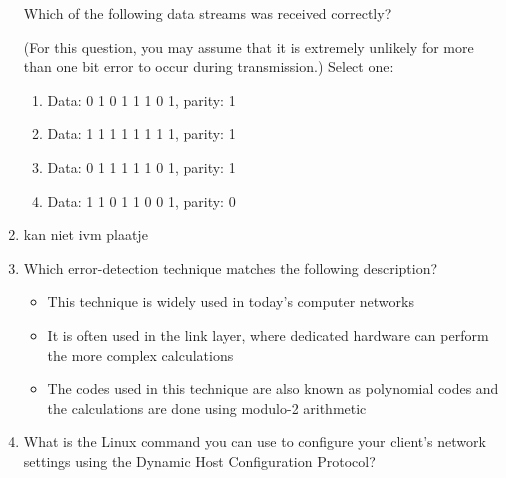 \begin{enumerate}
    Which of the following data streams was received correctly?

    (For this question, you may assume that it is extremely unlikely for more than one bit error to occur during transmission.)
    Select one:
    \begin{enumerate}
        \item Data: 0 1 0 1 1 1 0 1, parity: 1
        \item Data: 1 1 1 1 1 1 1 1, parity: 1
        \item Data: 0 1 1 1 1 1 0 1, parity: 1
        \item Data: 1 1 0 1 1 0 0 1, parity: 0
    \end{enumerate}
    \item kan niet ivm plaatje
    \item Which error-detection technique matches the following description?
    \begin{itemize}
        \item This technique is widely used in today's computer networks
        \item It is often used in the link layer, where dedicated hardware can perform the more complex calculations
        \item The codes used in this technique are also known as polynomial codes and the calculations are done using modulo-2 arithmetic

    \end{itemize}
    \item What is the Linux command you can use to configure your client's network settings using the Dynamic Host Configuration Protocol?
\end{enumerate}

